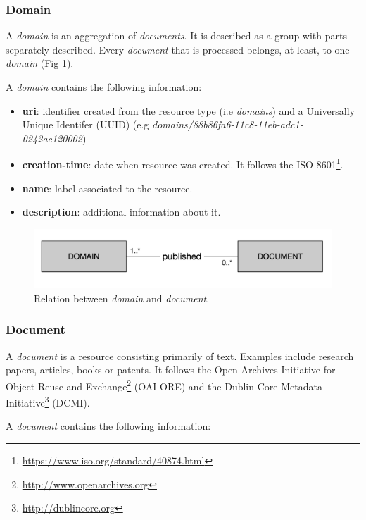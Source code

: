\subsubsection{Domain}

A \textit{domain} is an aggregation of \textit{documents}. It is described as a group with parts separately described. Every \textit{document} that is processed belongs, at least, to one \textit{domain} (Fig \ref{fig:librairy-model-domain}).

A \textit{domain} contains the following information: 
\begin{itemize}
\item \textbf{uri}: identifier created from the resource type (i.e \textit{domains}) and a Universally Unique Identifer (UUID) (e.g \textit{domains/88b86fa6-11c8-11eb-adc1-0242ac120002})
\item \textbf{creation-time}: date when resource was created. It follows the ISO-8601\footnote{\url{https://www.iso.org/standard/40874.html}}.
\item \textbf{name}: label associated to the resource.
\item \textbf{description}: additional information about it.
\end{itemize}

\begin{figure}
  \center
  \includegraphics[scale=0.45]{model-domain.png}
  \caption{Relation between \textit{domain} and \textit{document}.}
  \label{fig:librairy-model-domain}
\end{figure}

\subsubsection{Document}

A \textit{document} is a resource consisting primarily of text. Examples include research papers, articles, books or patents. It follows the Open Archives Initiative for Object Reuse and Exchange\footnote{\url{http://www.openarchives.org}} (OAI-ORE) and the Dublin Core Metadata Initiative\footnote{\url{http://dublincore.org}} (DCMI). 

A \textit{document} contains the following information:                                                              

